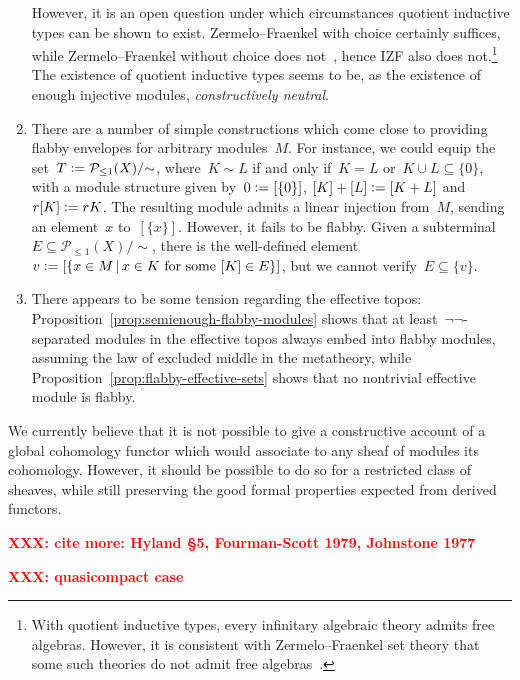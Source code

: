 \documentclass[oneside]{amsart}
\theoremstyle{definition}
\theoremstyle{plain}
\theoremstyle{remark}
\newcommand{\XXX}[1]{\textbf{\textcolor{red}{XXX: #1}}}
\renewcommand{\P}{\mathcal{P}}
\newcommand{\defeq}{\vcentcolon=}
\renewcommand{\_}{\mathpunct{.}\,}
\newcommand{\effective}{ef{}fective\xspace}
\begin{document}
\begin{enumerate}
However, it is an open question under which circumstances quotient inductive
types can be shown to exist. Zermelo--Fraenkel with choice certainly suffices,
while Zermelo--Fraenkel without choice does not~\cite[Section~9]{shulman-lumsdaine:hits},
hence IZF also does not.\footnote{With quotient inductive types, every infinitary
algebraic theory admits free algebras. However, it is consistent with
Zermelo--Fraenkel set theory that some such theories do not admit free
algebras~\cite{blass:free-algebras}.} The existence of quotient inductive types
seems to be, as the existence of enough injective modules, \emph{constructively
neutral}.

\item There are a number of simple constructions which come close to providing
flabby envelopes for arbitrary modules~$M$. For instance, we could equip the set~$T
\defeq \P_{\leq1}(X)/{\sim}$, where~$K \sim L$ if and only if~$K = L$ or~$K
\cup L \subseteq \{0\}$, with a module structure given by~$0 \defeq [\{0\}]$,
$[K]+[L] \defeq [K+L]$ and~$r [K] \defeq rK$. The resulting module admits a
linear injection from~$M$, sending an element~$x$ to~$[\{x\}]$. However, it
fails to be flabby. Given a subterminal~$E \subseteq \P_{\leq1}(X)/{\sim}$,
there is the well-defined element~$v \defeq [\{x \in M\,|\,\text{$x \in K$ for
some~$[K] \in E$}\}]$, but we cannot verify~$E \subseteq \{v\}$.

\item There appears to be some tension regarding the \effective topos:
Proposition~\ref{prop:semienough-flabby-modules} shows that at
least~$\neg\neg$-separated modules in the \effective topos always embed into
flabby modules, assuming the law of excluded middle in the metatheory, while
Proposition~\ref{prop:flabby-effective-sets} shows that no nontrivial \effective
module is flabby.
\end{enumerate}

We currently believe that it is not possible to give a constructive account of
a global cohomology functor which would associate to any sheaf of modules its
cohomology. However, it should be possible to do so for a restricted class of
sheaves, while still preserving the good formal properties expected from
derived functors.

\printbibliography
\enlargethispage{1em}

\XXX{cite more: Hyland §5,
Fourman-Scott 1979,
Johnstone 1977}

\XXX{quasicompact case}
\end{document}
